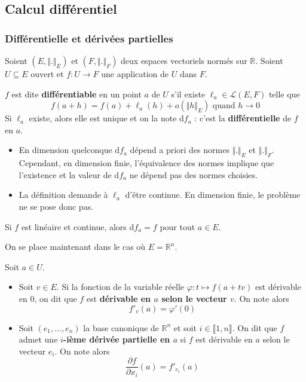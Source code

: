   \subsection{Calcul différentiel}

  \subsubsection{Différentielle et dérivées partielles}


  Soient $(E, \Vert . \Vert_E)$ et $(F, \Vert . \Vert_F)$ deux espaces vectoriels normés sur $\mathbb{R}$. Soient $U \subseteq E$ ouvert et $f : U \rightarrow F$ une application de $U$ dans $F$.

  \begin{definition}
    $f$ est dite \textbf{différentiable} en un point $a$ de $U$ s'il existe $\ell_a \in \mathcal{L}(E,F)$ telle que
    \[ f(a+h) = f(a) + \ell_a(h) + o(\Vert h \Vert_E) \text{ quand } h \longrightarrow 0 \]
    Si $\ell_a$ existe, alors elle est unique et on la note $\mathrm{d}f_a$ : c'est la \textbf{différentielle} de $f$ en $a$.
  \end{definition}

  \begin{remark}
    \begin{itemize}
      \item En dimension quelconque $\mathrm{d}f_a$ dépend a priori des normes $\Vert . \Vert_E$ et $\Vert . \Vert_F$. Cependant, en dimension finie, l'équivalence des normes implique que l'existence et la valeur de $\mathrm{d}f_a$ ne dépend pas des normes choisies.
      \item La définition demande à $\ell_a$ d'être continue. En dimension finie, le problème ne se pose donc pas.
    \end{itemize}
  \end{remark}

  \begin{example}
    Si $f$ est linéaire et continue, alors $\mathrm{d}f_a = f$ pour tout $a \in E$.
  \end{example}

  On se place maintenant dans le cas où $E = \mathbb{R}^n$.

  \begin{definition}
    Soit $a \in U$.
    \begin{itemize}
      \item Soit $v \in E$. Si la fonction de la variable réelle $\varphi : t \mapsto f(a+tv)$ est dérivable en $0$, on dit que $f$ est \textbf{dérivable en $a$ selon le vecteur $v$}. On note alors
      \[ f'_v(a) = \varphi'(0) \]
      \item Soit $(e_1, \dots, e_n)$ la base canonique de $\mathbb{R}^n$ et soit $i \in \llbracket 1, n \rrbracket$. On dit que $f$ admet une \textbf{$i$-ième dérivée partielle en $a$} si $f$ est dérivable en $a$ selon le vecteur $e_i$. On note alors
      \[ \frac{\partial f}{\partial x_i}(a) = f'_{e_i}(a) \]
    \end{itemize}
  \end{definition}

